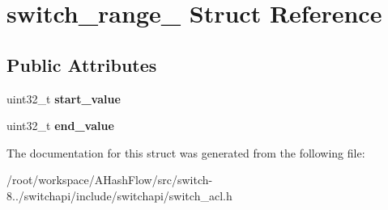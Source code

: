 \hypertarget{structswitch__range__}{\section{switch\+\_\+range\+\_\+ Struct Reference}
\label{structswitch__range__}
}
\subsection*{Public Attributes}
\begin{DoxyCompactItemize}
\item 
\hypertarget{structswitch__range___a675935c0b0967b470079938fcde957d2}{uint32\+\_\+t {\bfseries start\+\_\+value}}\label{structswitch__range___a675935c0b0967b470079938fcde957d2}

\item 
\hypertarget{structswitch__range___ac447342d71dd216424cd5a2d323ea65e}{uint32\+\_\+t {\bfseries end\+\_\+value}}\label{structswitch__range___ac447342d71dd216424cd5a2d323ea65e}

\end{DoxyCompactItemize}


The documentation for this struct was generated from the following file\+:\begin{DoxyCompactItemize}
\item 
/root/workspace/\+A\+Hash\+Flow/src/switch-\/8../switchapi/include/switchapi/switch\+\_\+acl.\+h\end{DoxyCompactItemize}
